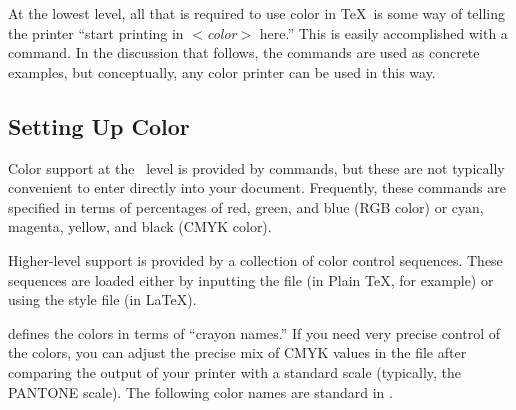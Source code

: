 At the lowest level, all that is required to use color in \TeX\ is some
way of telling the printer ``start printing in $<${\em color\/}$>$ here.''
This is easily accomplished with a  command.  In the
discussion that follows, the   commands are used
as concrete examples, but conceptually, any color printer can be
used in this way.

\subsection{Setting Up Color}

Color  support 
at the \dvidriver\ level is provided by 
commands, but these are not typically convenient to enter directly
into your document.  Frequently, these commands are specified in
terms of percentages of red, green, and blue 
(RGB color)  or 
cyan, magenta, yellow, and black (CMYK color).

Higher-level support is provided by a collection of color control sequences.
These sequences are loaded either by inputting the  file
 (in 
Plain \TeX, for example)  or using the
 style 
file (in \LaTeX).

 defines the colors in terms of ``crayon names.''  If you
need very precise control of the colors, you can adjust the precise mix
of CMYK values in the file  after comparing the 
output of your printer with a standard scale (typically, the PANTONE
scale).  The following color names are standard in .

